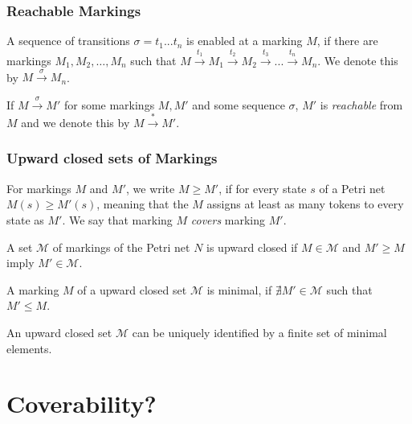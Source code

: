 \subsubsection{Reachable Markings}
A sequence of transitions $\sigma = t_{1}...t_{n}$ is enabled at a marking $M$, if there are markings $M_{1},M_{2},\dots,M_{n}$ such that $M \xrightarrow{t_{1}} M_{1} \xrightarrow{t_{2}} M_{2} \xrightarrow{t_{3}} ... \xrightarrow{t_{n}} M_{n}$. We denote this by $M \xrightarrow{\sigma} M_{n}$. 

If $M \xrightarrow{\sigma} M'$ for some markings $M,M'$ and some sequence $\sigma$, $M'$ is \emph{reachable} from $M$ and we denote this by $M \xrightarrow{*} M'$.


\subsubsection{Upward closed sets of Markings}
For markings $M$ and $M'$, we write $M \ge M'$, if for every state $s$ of a Petri net $M(s) \ge M'(s)$, meaning that the $M$ assigns at least as many tokens to every state as $M'$. We say that marking $M$ \emph{covers} marking $M'$.


A set $\mathcal{M}$ of markings of the Petri net $N$ is upward closed if $M \in \mathcal{M}$ and $M' \ge M$ imply $M' \in \mathcal{M}$.

A marking $M$ of a upward closed set $\mathcal{M}$ is minimal, if $\nexists M' \in \mathcal{M}$ such that $M' \le M$.

An upward closed set $\mathcal{M}$ can be uniquely identified by a finite set of minimal elements. 

\section{Coverability?}